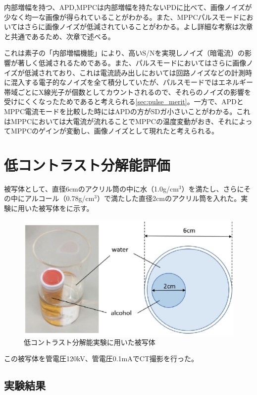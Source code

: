 内部増幅を持つ、APD,MPPCは内部増幅を持たないPDに比べて、画像ノイズが少なく均一な画像が得られていることがわかる。また、MPPCパルスモードにおいてはさらに画像ノイズが低減されていることがわかる。よし詳細な考察は次章と共通であるため、次章で述べる。


これは素子の「内部増幅機能」により、高いS/Nを実現しノイズ（暗電流）の影響が著しく低減されるためである。また、パルスモードにおいてはさらに画像ノイズが低減されており、これは電流読み出しにおいては回路ノイズなどの計測時に混入する電子的なノイズを全て積分していたが、パルスモードではエネルギー帯域ごとにX線光子が個数としてカウントされるので、それらのノイズの影響を受けにくくなったためであると考えられる\ref{sec:pulse_merit}。一方で、APDとMPPC電流モードを比較した時にはAPDの方がSDガ小さいことがわかる。これはMPPCにおいては大電流が流れることでMPPCの温度変動がおき、それによってMPPCのゲインが変動し、画像ノイズとして現れたと考えられる。
\fi


\section{低コントラスト分解能評価}
被写体として、直径6cmのアクリル筒の中に水（1.0g/cm$^3$）を満たし、さらにその中にアルコール（0.78g/cm$^3$）で満たした直径2cmのアクリル筒を入れた。実験に用いた被写体をに示す。

\begin{figure}[H]
 \begin{center}
 \includegraphics[width=14cm]{image2/chapter5/phantom1.eps}
 \end{center}
 \caption{低コントラスト分解能実験に用いた被写体}
 \label{fig:phantom1}
\end{figure}

この被写体を管電圧120kV、管電圧0.1mAでCT撮影を行った。

\subsection{実験結果}

